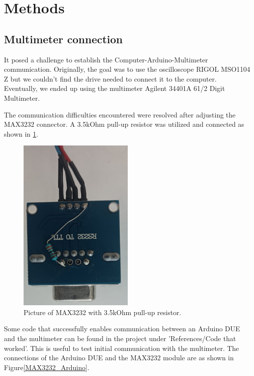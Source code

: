 \section{Methods}

\subsection{Multimeter connection}
It posed a challenge to establish the Computer-Arduino-Multimeter communication. Originally, the goal was to use the oscilloscope RIGOL MSO1104 Z but we couldn't find the drive needed to connect it to the computer. Eventually, we ended up using the multimeter Agilent 34401A 61/2 Digit Multimeter\cite{keysight34401A}. 

The communication difficulties encountered were resolved after adjusting the MAX3232 connector. A 3.5kOhm pull-up resistor was utilized and connected as shown in \ref{MAX3232}.

\begin{figure}[H]
          \centering
          \includegraphics[angle=90, width=0.5\textwidth]{img/RS232_connector.jpeg}
          \caption{Picture of MAX3232 with 3.5kOhm pull-up resistor.}
          \label{MAX3232}
    \end{figure}

Some code that successfully enables communication between an Arduino DUE and the multimeter can be found in the project under 'References/Code that worked'. This is useful to test initial communication with the multimeter. The connections of the Arduino DUE and the MAX3232 module are as shown in Figure\ref{MAX3232_Arduino}.

